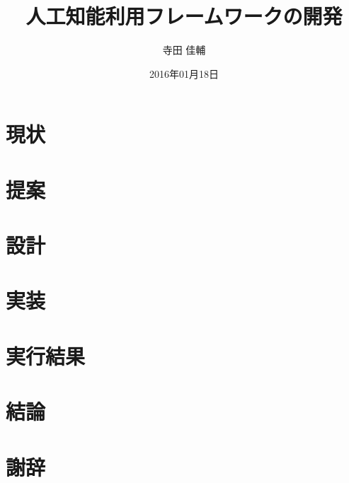 \documentclass[a4paper,10pt,onecolumn,oneside,openany]{jsbook}
\author{寺田 佳輔}										%
\title{人工知能利用フレームワークの開発}				%
\date{2016年01月18日}									%
\begin{document}



\chapter{現状}




\chapter{提案}



\chapter{設計}


\chapter{実装}

\chapter{実行結果}

\chapter{結論}


\chapter*{謝辞}



\end{document}
